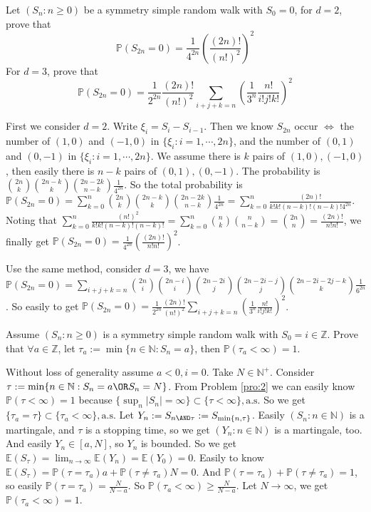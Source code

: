 \documentclass{ctexart}
\begin{document}
\begin{problem}\label{pro:3}
  Let \((S_n:n \geq 0)\) be a symmetry simple random walk with \(S_0=0\), for \(d=2\), prove that
  \[
    \mathbb{P}(S_{2n}=0)=\frac{1}{4^{2n}}\left(\frac{(2n)!}{(n!)^2}\right)^2
  \]
  For \(d=3\), prove that
  \[
    \mathbb{P}(S_{2n}=0)=\frac{1}{2^{2n}}\frac{(2n)!}{(n!)^2}\sum_{i + j + k = n} \left(\frac{1}{3^n}\frac{n!}{i!j!k!}\right)^2
  \]
\end{problem}
\begin{solution}
  First we consider \(d=2\). Write \(\xi_i=S_i-S_{i-1}\).
  Then we know \(S_{2n}\) occur \(\iff\) the number of \((1,0)\) and \((-1,0)\) in \(\{\xi_i:i=1,\cdots,2n\}\),
  and the number of \((0,1)\) and \((0,-1)\) in \(\{\xi_i:i=1,\cdots,2n\}\).
  We assume there is \(k\) pairs of \((1,0),(-1,0)\), then easily there is \(n-k\) pairs of \((0,1),(0,-1)\).
  The probability is \(\binom{2n}{k}\binom{2n-k}{k}\binom{2n-2k}{n-k}\frac{1}{4^{2n}}\).
  So the total probability is
  \(\mathbb{P}(S_{2n}=0)=\sum_{k=0}^{n}\binom{2n}{k}\binom{2n-k}{k}\binom{2n-2k}{n-k}\frac{1}{4^{2n}}=\sum_{k=0}^{n}\frac{(2n)!}{k!k!(n-k)!(n-k)!4^{2n}}\).
  Noting that \(\sum_{k=0}^{n}\frac{(n!)^2}{k!k!(n-k)!(n-k)!}=\sum_{k=0}^{n}\binom{n}{k}\binom{n}{n-k}=\binom{2n}{n}=\frac{(2n)!}{n!n!}\),
  we finally get \(\mathbb{P}(S_{2n}=0)=\frac{1}{4^{2n}}\left(\frac{(2n)!}{n!n!}\right)^2\).

  Use the same method, consider \(d=3\), we have
  \(\mathbb{P}(S_{2n}=0)=\sum_{i+j+k=n} \binom{2n}{i}\binom{2n-i}{i}\binom{2n-2i}{j}\binom{2n-2i-j}{j}\binom{2n-2i-2j-k}{k} \frac{1}{6^{2n}}\).
  So easily to get \(\mathbb{P}(S_{2n}=0)=\frac{1}{2^{2n}}\frac{(2n)!}{(n!)^2}\sum_{i + j + k = n} \left(\frac{1}{3^n}\frac{n!}{i!j!k!}\right)^2\).
\end{solution}

\begin{problem}\label{pro:4}
  Assume \((S_n:n \geq 0)\) is a symmetry simple random walk with \(S_0 = i \in \mathbb{Z}\).
  Prove that \(\forall a \in \mathbb{Z}\), let \(\tau_a:=\min\{n \in \mathbb{N}:S_n=a \}\), then \(\mathbb{P}(\tau_a < \infty) = 1 \).
\end{problem}
\begin{solution}
  Without loss of generality assume \(a<0,i=0\). Take \(N \in \mathbb{N}^+\). Consider \(\tau:=\min\{n \in \mathbb{N}:S_n=a \OR S_n=N\}\).
  From Problem \ref{pro:2} we can easily know \(\mathbb{P}(\tau < \infty)=1\) because \(\{\sup_n|S_n|=\infty\}\subset \{\tau<\infty\},\text{a.s.}\)
  So we get \(\{\tau_a = \tau\} \subset \{\tau_a<\infty\},\text{a.s.}\)
  Let \(Y_n:=S_{n \AND \tau}:=S_{\min\{n,\tau\}}\).
  Easily \((S_n:n \in \mathbb{N})\) is a martingale, and \(\tau\) is a stopping time, so we get
  \((Y_n:n \in \mathbb{N})\) is a martingale, too.
  And easily \(Y_n \in [a,N]\), so \(Y_n\) is bounded.
  So we get \(\mathbb{E}(S_{\tau})=\lim_{n \to \infty}\mathbb{E}(Y_n)=\mathbb{E}(Y_0)=0\).
  Easily to know \(\mathbb{E}(S_{\tau})=\mathbb{P}(\tau=\tau_a)a+\mathbb{P}(\tau \neq \tau_a)N=0\).
  And \(\mathbb{P}(\tau=\tau_a)+\mathbb{P}(\tau \neq \tau_a)=1\),
  so easily \(\mathbb{P}(\tau=\tau_a)=\frac{N}{N-a}\).
  So \(\mathbb{P}(\tau_a<\infty)\geq \frac{N}{N-a}\).
  Let \(N \to \infty\), we get \(\mathbb{P}(\tau_a<\infty)=1\).
\end{solution}
\end{document}
